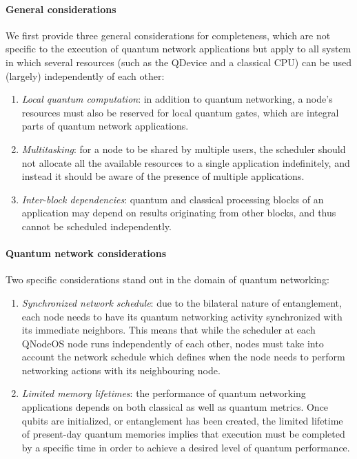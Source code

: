 \paragraph{General considerations}

We first provide three general considerations for completeness, which are not specific to the execution of quantum network applications but apply to all system in which several resources (such as the \ac{QDevice} and a classical \ac{CPU}) can be used (largely) independently of each other:
%
\begin{enumerate}
\item \emph{Local quantum computation}: in addition to quantum networking, a node's resources must also be reserved for local quantum gates, which are integral parts of quantum network applications.
\item \emph{Multitasking}: for a node to be shared by multiple users, the scheduler should not allocate all the available resources to a single application indefinitely, and instead it should be aware of the presence of multiple applications.
\item \emph{Inter-block dependencies}: quantum and classical processing blocks of an application may depend on results originating from other blocks, and thus cannot be scheduled independently.
\end{enumerate}

\paragraph{Quantum network considerations}

Two specific considerations stand out in the domain of quantum networking:
%
\begin{enumerate}
\item \emph{Synchronized network schedule}: due to the bilateral nature of entanglement, each node needs to have its quantum networking activity synchronized with its immediate neighbors. This means that while the scheduler at each \ac{QNodeOS} node runs independently of each other, nodes must take into account the network schedule which defines when the node needs to perform networking actions with its neighbouring node. 
\item \emph{Limited memory lifetimes}: the performance of quantum networking applications depends on both classical as well as quantum metrics. Once qubits are initialized, or entanglement has been created, the limited lifetime of present-day quantum memories implies that execution must be completed by a specific time in order to achieve a desired level of quantum performance. 
\end{enumerate}

